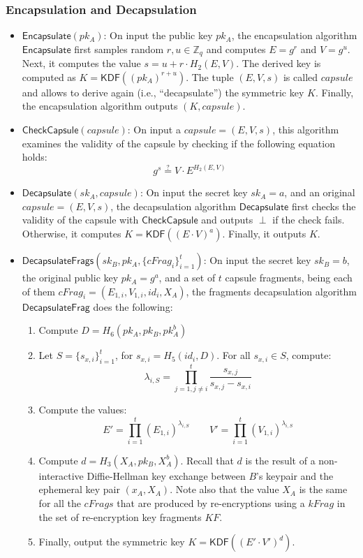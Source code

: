 \documentclass{amsart}
\begin{document}
\subsubsection{Encapsulation and Decapsulation}

\begin{itemize}
	\item $\mathsf{Encapsulate}(pk_A)$: On input the public key $pk_A$, the encapsulation algorithm $\mathsf{Encapsulate}$ first samples random $r, u \in \mathbb Z_q$ and computes $E = g^r$ and $V = g^u$. 
	Next, it computes the value $s = u + r \cdot H_2(E, V)$. 
	The derived key is computed as $K = \mathsf{KDF}((pk_A)^{r + u})$. 
	The tuple $(E, V, s)$ is called $capsule$ and allows to derive again (i.e., ``decapsulate'') the symmetric key $K$. 
	Finally, the encapsulation algorithm outputs $(K, capsule)$.	
	
	\item $\mathsf{CheckCapsule}(capsule)$: On input a $capsule = (E, V, s)$, this algorithm examines the validity of the capsule by checking if the following equation holds:
	$$ g^s \stackrel{?}{=} V \cdot E^{H_2(E, V)}$$
	
	\item $\mathsf{Decapsulate}(sk_A, capsule)$: On input the secret key $sk_A = a$, and an original $capsule = (E,V,s)$, the decapsulation algorithm $\mathsf{Decapsulate}$ first checks the validity of the capsule with $\mathsf{CheckCapsule}$ and outputs $\perp$ if the check fails. Otherwise, it computes $K = \mathsf{KDF}((E\cdot V)^{a})$. Finally, it outputs $K$.
	
	\item $\mathsf{DecapsulateFrags}(sk_B, pk_A, \{cFrag_i\}_{i=1}^t)$: On input the secret key $sk_B = b$, the original public key $pk_A = g^a$, and a set of $t$ capsule fragments, being each of them $cFrag_i = (E_{1,i}, V_{1,i}, id_i, X_A)$, the fragments decapsulation algorithm $\mathsf{DecapsulateFrag}$ does the following:
	
	\begin{enumerate}
	\item Compute $ D = H_6(pk_A, pk_B, pk_A^b)$
    \item Let $S = \{s_{x,i}\}_{i=1}^t$, for $s_{x,i} = H_5(id_i, D)$. For all $s_{x,i}\in S$, compute:
    \[\lambda_{i, S} = \prod\limits_{j=1, j\neq i}^{t} \frac{s_{x,j}}{s_{x,j}-s_{x,i}}\]
    \item Compute the values:
     	$$E' = \prod\limits_{i=1}^{t} (E_{1,i})^{\lambda_{i, S}}	
		\qquad
		V' = \prod\limits_{i=1}^{t} (V_{1,i})^{\lambda_{i, S}}$$
	\item Compute $d = H_3(X_A, pk_B, X_A^b)$. Recall that $d$ is the result of a non-interactive Diffie-Hellman key exchange between $B$'s keypair and the ephemeral key pair $(x_A, X_A)$. Note also that the value $X_A$ is the same for all the $cFrags$ that are produced by re-encryptions using a $kFrag$ in the set of re-encryption key fragments $KF$. 
	\item Finally, output the symmetric key $K= \mathsf{KDF}((E'\cdot V')^{d})$. 
	\end{enumerate}
\end{itemize}
\end{document}
